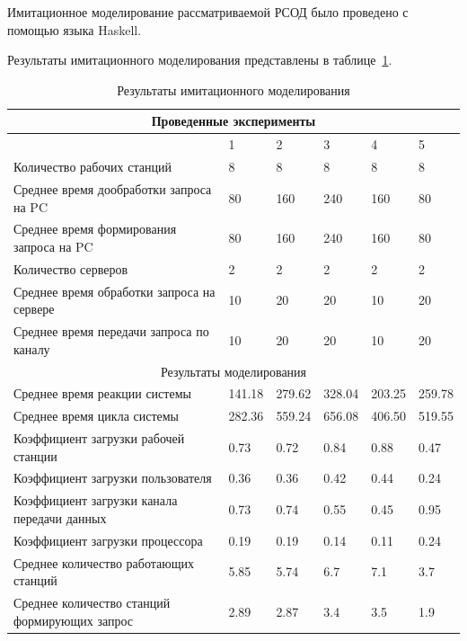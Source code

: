 \documentclass[russian,utf8,emptystyle]{eskdtext}
\begin{document}
Имитационное моделирование рассматриваемой РСОД было проведено с помощью языка Haskell. 

Результаты имитационного моделирования представлены в таблице~\ref{tab:sim-result}.

\begin{longtable}{p{9.5cm}|p{1.15cm}|p{1.15cm}|p{1.15cm}|p{1.15cm}|p{1.15cm}}
\caption{Результаты имитационного моделирования}
\label{tab:sim-result} \\
\hline
\multicolumn{6}{c}{Проведенные эксперименты} \\ \hline
                                                    & 1      & 2      & 3      & 4      & 5       \\ \cline{2-6}
Количество рабочих станций                          & 8      & 8      & 8      & 8      & 8      \\
Среднее время дообработки запроса на PC             & 80     & 160    & 240    & 160    & 80     \\
Среднее время формирования запроса на PC            & 80     & 160    & 240    & 160    & 80     \\
Количество серверов                                 & 2      & 2      & 2      & 2      & 2      \\
Среднее время обработки запроса на сервере          & 10     & 20     & 20     & 10     & 20     \\
Среднее время передачи запроса по каналу            & 10     & 20     & 20     & 10     & 20     \\  
\hline
\multicolumn{6}{c}{Результаты моделирования} \\ 
\hline
Среднее время реакции системы                       & 141.18 & 279.62 & 328.04 & 203.25 & 259.78 \\
Среднее время цикла системы                         & 282.36 & 559.24 & 656.08 & 406.50 & 519.55 \\
Коэффициент загрузки рабочей станции                & 0.73   & 0.72   & 0.84   & 0.88   & 0.47   \\
Коэффициент загрузки пользователя                   & 0.36   & 0.36   & 0.42   & 0.44   & 0.24   \\
Коэффициент загрузки канала передачи данных         & 0.73   & 0.74   & 0.55   & 0.45   & 0.95   \\
Коэффициент загрузки процессора                     & 0.19   & 0.19   & 0.14   & 0.11   & 0.24   \\
Среднее количество работающих станций               & 5.85   & 5.74   & 6.7    & 7.1    & 3.7    \\
Среднее количество станций формирующих запрос       & 2.89   & 2.87   & 3.4    & 3.5    & 1.9    \\
\end{longtable}
\end{document}
